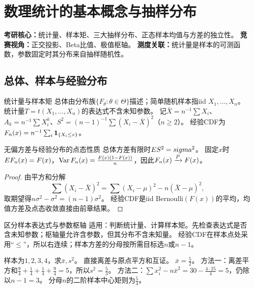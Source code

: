 \chapter{数理统计的基本概念与抽样分布}\label{ch:06}
\begin{examtip}
\textbf{考研核心：}统计量、样本矩、三大抽样分布、正态样本均值与方差的独立性。
\textbf{竞赛视角：}正交投影、Beta比值、极值枢轴。
\textbf{测度关联：}统计量是样本的可测函数，参数固定时其分布来自抽样随机性。
\end{examtip}
\section{总体、样本与经验分布}\label{sec:61}
\begin{definition}{统计量与样本矩}
总体由分布族$\{F_\theta:\theta\in\Theta\}$描述；简单随机样本指iid $X_1,\ldots,X_n$。
统计量$T=t(X_1,\ldots,X_n)$的表达式不含未知参数。
记$\bar X=n^{-1}\sum X_i$、$A_k=n^{-1}\sum X_i^k$、$S^2=(n-1)^{-1}\sum(X_i-\bar X)^2$（$n\ge2$）。
经验CDF为$F_n(x)=n^{-1}\sum_i\mathbf1_{\{X_i\le x\}}$。
\end{definition}
\begin{theorem}{无偏方差与经验分布的点态性质}
总体方差有限时$E S^2=sigma^2$。
固定$x$时$E F_n(x)=F(x)$，$\operatorname{Var} F_n(x)=\frac{F(x)(1-F(x))}{n}$，因此$F_n(x)\xrightarrow{P} F(x)$。
\end{theorem}
\begin{proof}
由平方和分解
\[\sum(X_i-\bar X)^2=\sum(X_i-\mu)^2-n(\bar X-\mu)^2,\]
取期望得$n\sigma^2-\sigma^2=(n-1)\sigma^2$。
经验CDF是iid Bernoulli$(F(x))$的平均，均值方差及点态收敛直接由前章结果。
\end{proof}
\begin{method}{区分样本表达式与参数枢轴}
适用：判断统计量、计算样本矩。先检查表达式是否含未知参数；枢轴量允许含参数，但其分布不含未知量。
经验CDF在样本点处采用“$\le$”，所以右连续；样本方差的分母按所需目标选$n$或$n-1$。
\end{method}
{样本为$1,2,3,4$，求$\bar x,s^2$。}
{直接离差与原点平方和互证。}
{$\bar x=\frac{5}{2}$。
方法一：离差平方和$\frac{9}{4}+\frac{1}{4}+\frac{1}{4}+\frac{9}{4}=5$，所以$s^2=\frac{5}{3}$。
方法二：$\sum x_i^2-n\bar x^2=30-\frac{4\cdot25}{4}=5$，仍除以$n-1=3$。
分母$n$的二阶样本中心矩则为$\frac{5}{4}$。}
